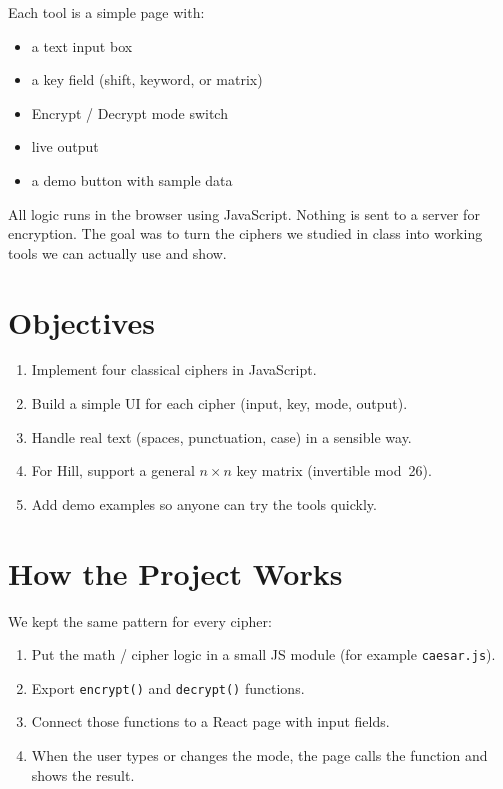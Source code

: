 \documentclass[12pt,a4paper]{article}
\begin{document}
Each tool is a simple page with:
\begin{itemize}[leftmargin=*]
  \item a text input box
  \item a key field (shift, keyword, or matrix)
  \item Encrypt / Decrypt mode switch
  \item live output
  \item a demo button with sample data
\end{itemize}

All logic runs in the browser using JavaScript. Nothing is sent to a server for encryption. The goal was to turn the ciphers we studied in class into working tools we can actually use and show.

\section{Objectives}

\begin{enumerate}[leftmargin=*]
  \item Implement four classical ciphers in JavaScript.
  \item Build a simple UI for each cipher (input, key, mode, output).
  \item Handle real text (spaces, punctuation, case) in a sensible way.
  \item For Hill, support a general \(n \times n\) key matrix (invertible mod~26).
  \item Add demo examples so anyone can try the tools quickly.
\end{enumerate}

\section{How the Project Works}

We kept the same pattern for every cipher:

\begin{enumerate}[leftmargin=*]
  \item Put the math / cipher logic in a small JS module (for example \texttt{caesar.js}).
  \item Export \texttt{encrypt()} and \texttt{decrypt()} functions.
  \item Connect those functions to a React page with input fields.
  \item When the user types or changes the mode, the page calls the function and shows the result.
\end{enumerate}
\end{document}
